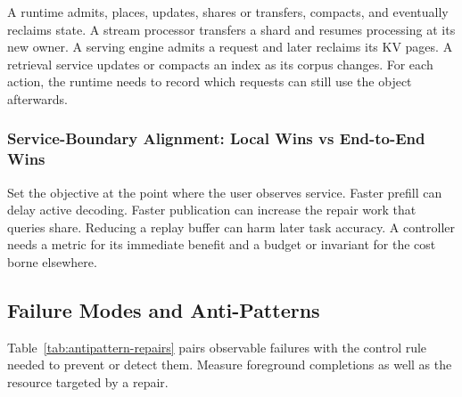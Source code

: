 \documentclass[manuscript]{acmart}
\begin{document}
A runtime admits, places, updates, shares or transfers, compacts, and eventually reclaims state. A stream processor transfers a shard and resumes processing at its new owner. A serving engine admits a request and later reclaims its KV pages. A retrieval service updates or compacts an index as its corpus changes. For each action, the runtime needs to record which requests can still use the object afterwards.

\subsubsection{Service-Boundary Alignment: Local Wins vs End-to-End Wins}

Set the objective at the point where the user observes service. Faster prefill can delay active decoding. Faster publication can increase the repair work that queries share. Reducing a replay buffer can harm later task accuracy. A controller needs a metric for its immediate benefit and a budget or invariant for the cost borne elsewhere.

\subsection{Failure Modes and Anti-Patterns}

Table~\ref{tab:antipattern-repairs} pairs observable failures with the control rule needed to prevent or detect them. Measure foreground completions as well as the resource targeted by a repair.
\end{document}
